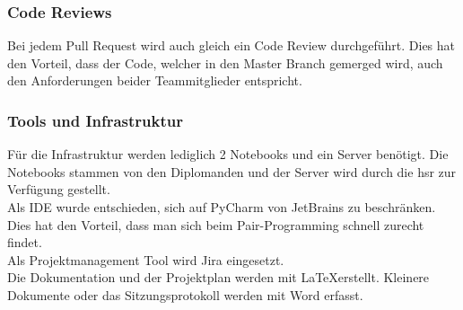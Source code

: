 \subsubsection*{Code Reviews}
Bei jedem Pull Request wird auch gleich ein Code Review durchgeführt. Dies hat den Vorteil, dass der Code, welcher in den Master Branch gemerged wird, auch den Anforderungen beider Teammitglieder entspricht.

\subsubsection*{Tools und Infrastruktur}
Für die Infrastruktur werden lediglich 2 Notebooks und ein Server benötigt. Die Notebooks stammen von den Diplomanden und der Server wird durch die \gls{hsr} zur Verfügung gestellt. \\
Als IDE wurde entschieden, sich auf PyCharm von JetBrains zu beschränken. Dies hat den Vorteil, dass man sich beim Pair-Programming schnell zurecht findet. \\
Als Projektmanagement Tool wird Jira eingesetzt. \\
Die Dokumentation und der Projektplan werden mit \LaTeX erstellt. Kleinere Dokumente oder das Sitzungsprotokoll werden mit Word erfasst. 

\newpage